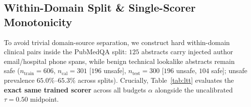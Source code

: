 \documentclass{article}
\begin{document}
\subsection{Within-Domain Split \& Single-Scorer Monotonicity}
To avoid trivial domain-source separation, we construct hard within-domain clinical pairs inside the PubMedQA split: $125$ abstracts carry injected author email/hospital phone spans, while benign technical lookalike abstracts remain safe ($n_{\text{train}}=606$, $n_{\text{cal}}=301$ [$196$ unsafe], $n_{\text{test}}=300$ [$196$ unsafe, $104$ safe]; unsafe prevalence $65.0\%\text{--}65.3\%$ across splits). Crucially, Table~\ref{tab:ltt} evaluates the \textbf{exact same trained scorer} across all budgets $\alpha$ alongside the uncalibrated $\tau=0.50$ midpoint.

\begin{table}[t]
\caption{Single-scorer LTT sweep on held-out test set ($n_{\text{cal}}=301$, $n_{\text{test}}=300$, $\delta=0.05$). Fixed bottom floor $\tau_{\text{drop}}=0.25$ makes $\tau_{\text{keep}}$ and abstention strictly monotonic.}
\label{tab:ltt}
\vskip 0.08in
\begin{center}
\end{center}
\vskip -0.14in
\end{table}
\end{document}

